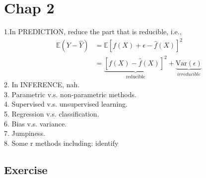 \section{Chap 2}
1.In PREDICTION, reduce the part that is reducible, i.e.,
\begin{align}
\mathbb{E}(Y-\hat{Y}) &= \mathbb{E}[f(X)+\epsilon-\hat{f}(X)]^2 \\&=
\underbrace{[f(X) -\hat{f}(X)]^2}_{\text{reducible}} +
\underbrace{\text{Var}(\epsilon)}_{irreducible}
\end{align}
2. In INFERENCE, nah. \\
3. Parametric v.s. non-parametric methods. \\
4. Supervised v.s. unsupervised learning. \\
5. Regression v.s. classification. \\
6. Bias v.s. variance. \\
7. Jumpiness. \\
8. Some r methods including: identify

\subsection*{Exercise}
